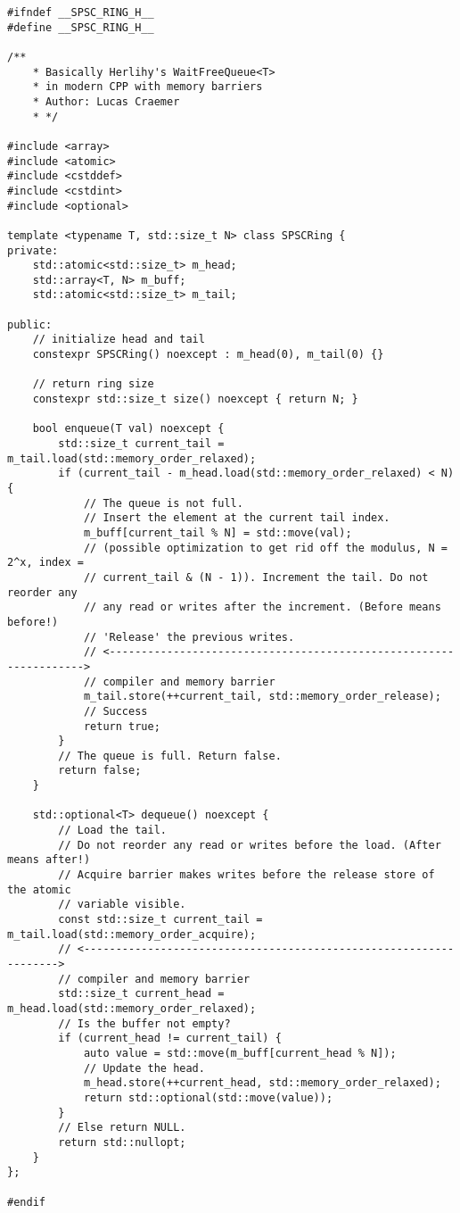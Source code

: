 \begin{lstlisting}[caption={Herlihy's "WaitFreeQueue<T>" in C++},label=append_spsc]
#ifndef __SPSC_RING_H__
#define __SPSC_RING_H__

/**
    * Basically Herlihy's WaitFreeQueue<T>
    * in modern CPP with memory barriers
    * Author: Lucas Craemer
    * */

#include <array>
#include <atomic>
#include <cstddef>
#include <cstdint>
#include <optional>

template <typename T, std::size_t N> class SPSCRing {
private:
    std::atomic<std::size_t> m_head;
    std::array<T, N> m_buff;
    std::atomic<std::size_t> m_tail;

public:
    // initialize head and tail
    constexpr SPSCRing() noexcept : m_head(0), m_tail(0) {}

    // return ring size
    constexpr std::size_t size() noexcept { return N; }

    bool enqueue(T val) noexcept {
        std::size_t current_tail = m_tail.load(std::memory_order_relaxed);
        if (current_tail - m_head.load(std::memory_order_relaxed) < N) {
            // The queue is not full.
            // Insert the element at the current tail index.
            m_buff[current_tail % N] = std::move(val);
            // (possible optimization to get rid off the modulus, N = 2^x, index =
            // current_tail & (N - 1)). Increment the tail. Do not reorder any
            // any read or writes after the increment. (Before means before!)
            // 'Release' the previous writes.
            // <------------------------------------------------------------------>
            // compiler and memory barrier
            m_tail.store(++current_tail, std::memory_order_release);
            // Success
            return true;
        }
        // The queue is full. Return false.
        return false;
    }

    std::optional<T> dequeue() noexcept {
        // Load the tail.
        // Do not reorder any read or writes before the load. (After means after!)
        // Acquire barrier makes writes before the release store of the atomic
        // variable visible.
        const std::size_t current_tail = m_tail.load(std::memory_order_acquire);
        // <------------------------------------------------------------------>
        // compiler and memory barrier
        std::size_t current_head = m_head.load(std::memory_order_relaxed);
        // Is the buffer not empty?
        if (current_head != current_tail) {
            auto value = std::move(m_buff[current_head % N]);
            // Update the head.
            m_head.store(++current_head, std::memory_order_relaxed);
            return std::optional(std::move(value));
        }
        // Else return NULL.
        return std::nullopt;
    }
};

#endif    
\end{lstlisting}